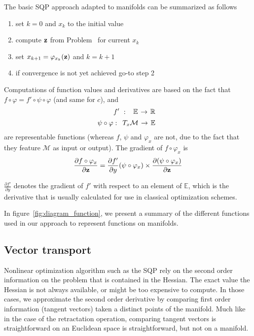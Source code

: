 The basic SQP approach adapted to manifolds can be summarized as follows
\begin{enumerate}
  \item set $k=0$ and $x_k$ to the initial value
  \item compute ${\bf z}$ from Problem~ for current $x_k$
  \item set $x_{k+1} = \varphi_{x_k}({\bf z})$ and $k=k+1$
  \item if convergence is not yet achieved go-to step 2
\end{enumerate}

Computations of function values and derivatives are based on the fact that $f \circ \varphi = f' \circ \psi \circ \varphi$ (and same for $c$), and
\begin{align}
  f'\ :\
  \begin{array}{ccc}
    \mathbb{E} & \reduce{\rightarrow}{6} & \mathbb{R}
  \end{array} \nonumber\\
  \psi\circ\varphi:
  \begin{array}{ccc}
    T_x{\mathcal{M}} & \reduce{\rightarrow}{6} & \mathbb{E}
  \end{array} \nonumber%
\end{align}
are representable functions (whereas $f$, $\psi$ and $\varphi_x$ are not, due to the fact that they feature $\mathcal{M}$ as input or output).
The gradient of $f \circ \varphi_x$ is
\begin{align}
  \frac{\partial f\circ\varphi_x}{\partial {\bf z}}=
  \frac{\partial f'}{\partial y}(\psi\circ\varphi_x)\times
  \frac{\partial (\psi\circ\varphi_x)}{\partial {\bf z}}
\end{align}

$\frac{\partial f'}{\partial y}$ denotes the gradient of $f'$ with respect to an element of $\mathbb{E}$, which is the derivative that is usually calculated for use in classical optimization schemes.

In figure~\ref{fig:diagram_function}, we present a summary of the different functions used in our approach to represent functions on manifolds.

\subsection{Vector transport}
\label{sub:vector_transport}

Nonlinear optimization algorithm such as the SQP rely on the second order information on the problem that is contained in the Hessian.
The exact value the Hessian is not always available, or might be too expensive to compute.
In those cases, we approximate the second order derivative by comparing first order information (tangent vectors) taken a distinct points of the manifold.
Much like in the case of the retractation operation, comparing tangent vectors is straightforward on an Euclidean space is straightforward, but not on a manifold.

